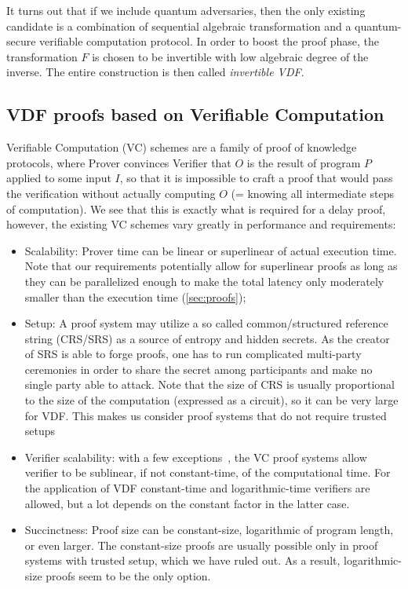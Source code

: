\documentclass{article}
\begin{document}
It turns out that if we include quantum adversaries, then the only existing candidate is a combination of sequential algebraic transformation and a quantum-secure verifiable computation protocol. In order to boost the proof phase, the transformation $F$ is chosen to be invertible with low algebraic degree of the inverse. The entire construction is then called  \emph{invertible  VDF}.  

\subsection{VDF proofs based on Verifiable Computation}

Verifiable Computation (VC) schemes are a family of proof of knowledge protocols, where Prover convinces Verifier that $O$ is the result of program $P$ applied to some input $I$, so that it is impossible to craft a proof that would pass the verification without actually computing $O$ (= knowing all intermediate steps of computation). We see that this is exactly what is required for a delay proof, however, the existing VC schemes vary greatly in performance and requirements:
\begin{itemize}
    \item Scalability: Prover time can be linear or superlinear of actual execution time. Note that our requirements potentially allow for superlinear proofs as long as they can be parallelized enough to make the total latency only moderately smaller than the execution time (\cref{sec:proofs});
    \item Setup: A proof system may utilize a so called common/structured reference string (CRS/SRS) as a source of entropy and hidden secrets. As the creator of SRS is able to forge proofs, one has to run complicated multi-party ceremonies in order to share the secret   among participants and make no single party able to attack. Note that the size of CRS is usually proportional to the size of the computation (expressed as a circuit), so it can be very large for VDF. This makes us consider proof systems that do not require trusted setups~\cite{DBLP:conf/ccs/AmesHIV17,DBLP:conf/sp/WahbyTSTW18,DBLP:conf/sp/BunzBBPWM18,DBLP:conf/crypto/Ben-SassonBHR19} 
    \item Verifier scalability: with a few exceptions~\cite{DBLP:conf/sp/BunzBBPWM18}, the VC proof systems allow verifier to be sublinear, if not constant-time, of the computational time. For the application of VDF constant-time and logarithmic-time verifiers are allowed, but a lot depends on the constant factor in the latter case.
    \item Succinctness: Proof size can be constant-size, logarithmic of program length, or even larger. The constant-size proofs are usually possible only in proof systems with trusted setup, which we have ruled out. As a result, logarithmic-size proofs seem to be the only option. 
\end{itemize}
\end{document}
